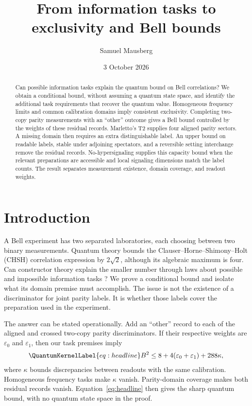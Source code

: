 \documentclass[a4paper,11pt,twocolumn,unpublished]{quantumarticle}
\title{From information tasks to exclusivity and Bell bounds}
\author{Samuel Mausberg}
\affiliation{Independent Researcher}
\date{3 October 2026}
\let\label\QuantumKernelLabel
\newcommand{\eps}{\varepsilon}
\begin{document}
\maketitle
\begin{abstract}
Can possible information tasks explain the quantum bound on Bell correlations? We obtain a conditional bound, without assuming a quantum state space, and identify the additional task requirements that recover the quantum value. Homogeneous frequency limits and common calibration domains imply consistent exclusivity. Completing two-copy parity measurements with an ``other'' outcome gives a Bell bound controlled by the weights of these residual records. Marletto's T2 supplies four aligned parity sectors. A missing domain then requires an extra distinguishable label. An upper bound on readable labels, stable under adjoining spectators, and a reversible setting interchange remove the residual records. No-hypersignaling supplies this capacity bound when the relevant preparations are accessible and local signaling dimensions match the label counts. The result separates measurement existence, domain coverage, and readout weights.
\end{abstract}

\section{Introduction}
A Bell experiment has two separated laboratories, each choosing between two binary measurements. Quantum theory bounds the Clauser--Horne--Shimony--Holt (CHSH) correlation expression by $2\sqrt2$, although its algebraic maximum is four. Can constructor theory explain the smaller number through laws about possible and impossible information tasks \cite{cti,ctp}? We prove a conditional bound and isolate what its domain premise must accomplish. The issue is not the existence of a discriminator for joint parity labels. It is whether those labels cover the preparation used in the experiment.

The answer can be stated operationally. Add an ``other'' record to each of the aligned and crossed two-copy parity discriminators. If their respective weights are $\eps_0$ and $\eps_1$, then our task premises imply
\begin{equation}\label{eq:headline}
 B^2\leq 8+4(\eps_0+\eps_1)+288\kappa,
\end{equation}
where $\kappa$ bounds discrepancies between readouts with the same calibration. Homogeneous frequency tasks make $\kappa$ vanish. Parity-domain coverage makes both residual records vanish. Equation~\eqref{eq:headline} then gives the sharp quantum bound, with no quantum state space in the proof.
\end{document}
